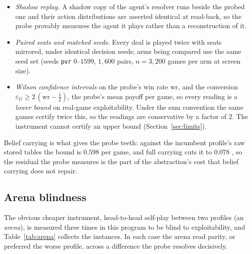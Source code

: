 \documentclass[11pt]{article}
\theoremstyle{plain}
\theoremstyle{definition}
\theoremstyle{remark}
\newcommand{\code}[1]{\texttt{\small #1}}
\newcommand{\game}{\ensuremath{G}}
\newcommand{\epsG}{\ensuremath{\varepsilon_{\game}}}
\begin{document}
\begin{itemize}\itemsep2pt
  \item \emph{Shadow replay.} A shadow copy of the agent's
        resolver runs beside the probed one and their action
        distributions are asserted identical at read-back, so the probe
        provably measures the agent it plays rather than a
        reconstruction of it.
  \item \emph{Paired seats and matched seeds.} Every deal is played
        twice with seats mirrored, under identical decision seeds; arms
        being compared use the same seed set (seeds \code{pvr}
        $0$--$1599$, $1{,}600$ pairs, $n=3{,}200$ games per arm at
        screen size).
  \item \emph{Wilson confidence intervals} on the probe's win rate
        $\mathrm{wr}$, and the conversion
        $\epsG \ge 2\,(\mathrm{wr}-\tfrac12)$, the probe's mean payoff
        per game, so every reading is a \emph{lower bound} on
        real-game exploitability. Under the sum convention the same
        games certify twice this, so the readings are conservative by
        a factor of $2$. The instrument cannot certify an upper bound
        (Section~\ref{sec:limits}).
\end{itemize}

Belief carrying is what gives the probe teeth: against the incumbent
profile's raw stored tables the bound is $0.598$ per game, and full
carrying cuts it to $0.078$ \cite{rb3}, so the residual the probe
measures is the part of the abstraction's cost that belief carrying
does not repair.

\subsection{Arena blindness}\label{sec:arena}

The obvious cheaper instrument, head-to-head self-play between two
profiles (an \emph{arena}), is measured three times in this program to
be blind to exploitability, and Table~\ref{tab:arena} collects the
instances. In each case the arena read parity, or preferred the worse
profile, across a difference the probe resolves decisively.
\end{document}
